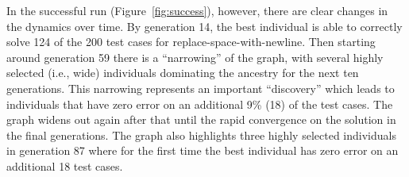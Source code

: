 \documentclass{sig-alternate}
\begin{document}
In the successful run (Figure~\ref{fig:success}), however, there are clear changes in the dynamics over time. By generation 14, the best individual is able to correctly solve 124 of the 200 test cases for replace-space-with-newline. Then starting around generation 59 there is a ``narrowing'' of the graph, with several highly selected (i.e., wide) individuals dominating the ancestry for the next ten generations. This narrowing represents an important ``discovery'' which leads to individuals that have zero error on an additional 9\% (18) of the test cases. The graph widens out again after that until the rapid convergence on the solution in the final generations. The graph also highlights three highly selected individuals in generation 87 where for the first time the best individual has zero error on an additional 18 test cases.



\end{document}
